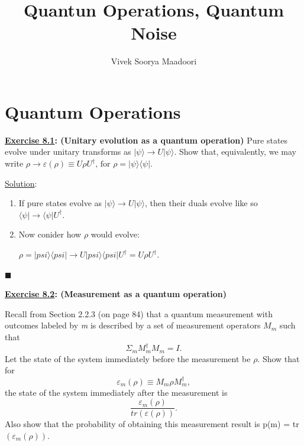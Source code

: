 \documentclass[a4paper,12pt]{amsbook}
\newcommand{\0}{{$|0\rangle$}}
\newcommand{\1}{{$|1\rangle$}}
\begin{document}
\author{Vivek Soorya Maadoori}
\title{Quantun Operations, Quantum Noise}
\maketitle
\tableofcontents

\section{Quantum Operations}

\vspace{1cm}
\textbf{\underline{Exercise 8.1}: (Unitary evolution as a quantum operation)} Pure states evolve under unitary transforms as $|\psi\rangle \rightarrow U|\psi\rangle$. Show that, equivalently, we may write $\rho \rightarrow \varepsilon (\rho) \equiv U\rho U^\dag \text{, for } \rho = |\psi\rangle\langle \psi|$.

\underline{Solution}:
\begin{enumerate}
    \item If pure states evolve as $|\psi\rangle \rightarrow U|\psi\rangle$, then their duals evolve like so $\langle \psi| \rightarrow \langle \psi| U^\dag$.

    \item Now conider how $\rho$ would evolve:

    $ \rho = |psi\rangle\langle psi| \rightarrow U |psi\rangle \langle psi | U^\dag = U \rho U^\dag$.
\end{enumerate}

$\blacksquare$

\vspace{1cm}
\textbf{\underline{Exercise 8.2}: (Measurement as a quantum operation)}

Recall from Section 2.2.3 (on page 84) that a quantum measurement with outcomes labeled by \textit{m} is described by a set of measurement operators $M_m$ such that $$\Sigma_m M^\dag_m M_m = I.$$ Let the state of the system immediately before the measurement be $\rho$. Show that for $$\varepsilon_m(\rho) \equiv M_m \rho M_m^\dag,$$ the state of the system immediately after the measurement is $$\frac{\varepsilon_m (\rho)}{tr(\varepsilon(\rho))}.$$ Also show that the probability of obtaining this measurement result is p(m) = tr$(\varepsilon_m (\rho))$.
\end{document}
